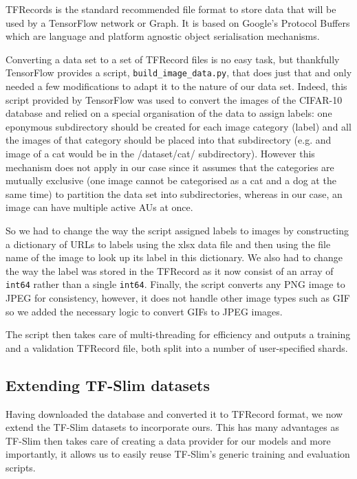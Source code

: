 \documentclass[12pt,twoside]{article}
\begin{document}
TFRecords is the standard recommended file format to store data that will be used by a TensorFlow network or Graph. It is based on Google's Protocol Buffers which are language and platform agnostic object serialisation mechanisms. 

Converting a data set to a set of TFRecord files is no easy task, but thankfully TensorFlow provides a script, \texttt{build\_image\_data.py}, that does just that and only needed a few modifications to adapt it to the nature of our data set. Indeed, this script provided by TensorFlow was used to convert the images of the CIFAR-10 database and relied on a special organisation of the data to assign labels: one eponymous subdirectory should be created for each image category (label) and all the images of that category should be placed into that subdirectory (e.g. and image of a cat would be in the /dataset/cat/ subdirectory). However this mechanism does not apply in our case since it assumes that the categories are mutually exclusive (one image cannot be categorised as a cat and a dog at the same time) to partition the data set into subdirectories, whereas in our case, an image can have multiple active AUs at once.

So we had to change the way the script assigned labels to images by constructing a dictionary of URLs to labels using the xlsx data file and then using the file name of the image to look up its label in this dictionary. We also had to change the way the label was stored in the TFRecord as it now consist of an array of \texttt{int64} rather than a single \texttt{int64}. Finally, the script converts any PNG image to JPEG for consistency, however, it does not handle other image types such as GIF so we added the necessary logic to convert GIFs to JPEG images.

The script then takes care of multi-threading for efficiency and outputs a training and a validation TFRecord file, both split into a number of user-specified shards.

\subsection{Extending TF-Slim datasets}

Having downloaded the database and converted it to TFRecord format, we now
extend the TF-Slim datasets to incorporate ours. This has many advantages as
TF-Slim then takes care of creating a data provider for our models and more
importantly, it allows us to easily reuse TF-Slim's generic training and
evaluation scripts.
\end{document}
